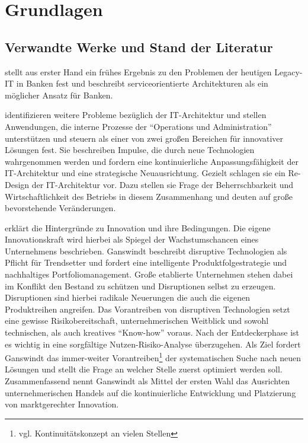 \chapter{Grundlagen}
\label{chapter:grundlagen}

\section{Verwandte Werke und Stand der Literatur}
\citet{Brockhoff2006} stellt aus erster Hand ein frühes Ergebnis zu den Problemen der heutigen Legacy-IT in Banken fest und beschreibt serviceorientierte Architekturen als ein möglicher Ansatz für Banken.

\citet{Bussmann2006} identifizieren weitere Probleme bezüglich der IT-Architektur und stellen Anwendungen, die interne Prozesse der \enquote{Operations und Administration} unterstützen und steuern als einer von zwei großen Bereichen für innovativer Lösungen fest. Sie beschreiben Impulse, die durch neue Technologien wahrgenommen werden und fordern eine kontinuierliche Anpassungsfähigkeit der IT-Architektur und eine strategische Neuausrichtung. Gezielt schlagen sie ein Re-Design der IT-Architektur vor. Dazu stellen sie Frage der Beherrschbarkeit und Wirtschaftlichkeit des Betriebs in diesem Zusammenhang und deuten auf große bevorstehende Veränderungen.

\citet{Ganswindt2006} erklärt die Hintergründe zu Innovation und ihre Bedingungen. Die eigene Innovationskraft wird hierbei als Spiegel der Wachstumschancen eines Unternehmens beschrieben. Ganswindt beschreibt disruptive Technologien als Pflicht für Trendsetter und fordert eine intelligente Produktfolgestrategie und nachhaltiges Portfoliomanagement. Große etablierte Unternehmen stehen dabei im Konflikt den Bestand zu schützen und Disruptionen selbst zu erzeugen. Disruptionen sind hierbei radikale Neuerungen die auch die eigenen Produktreihen angreifen. Das Vorantreiben von disruptiven Technologien setzt eine gewisse Risikobereitschaft, unternehmerischen Weitblick und sowohl technischen, als auch kreatives \enquote{Know-how} voraus. Nach der Entdeckerphase ist es wichtig in eine sorgfältige Nutzen-Risiko-Analyse überzugehen. Als Ziel fordert Ganswindt das immer-weiter Vorantreiben\footnote{vgl. Kontinuitätskonzept an vielen Stellen} der systematischen Suche nach neuen Lösungen und stellt die Frage an welcher Stelle zuerst optimiert werden soll. Zusammenfassend nennt Ganswindt als Mittel der ersten Wahl das Ausrichten unternehmerischen Handels auf die kontinuierliche Entwicklung und Platzierung von marktgerechter Innovation.

